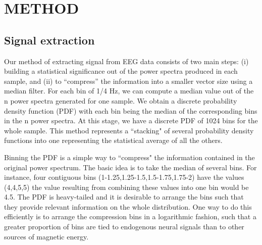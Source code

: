 \section{\uppercase{Method}}

\subsection{Signal extraction}

Our method of extracting signal from EEG data consists of two main steps: (i) building a statistical significance out of the power spectra produced in each sample, and (ii) to ``compress'' the information into a smaller vector size using a median filter. For each bin of 1/4 Hz, we can compute a median value out of the n power spectra generated for one sample. We obtain a discrete probability density function (PDF) with each bin being the median of the corresponding bins in the n power spectra. At this stage, we have a discrete PDF of 1024 bins for the whole sample. This method represents a ``stacking" of several probability density functions into one representing the statistical average of all the others.

Binning the PDF is a simple way to ``compress" the information contained in the original power spectrum. The basic idea is to take the median of several bins. For instance, four contiguous bins (1-1.25,1.25-1.5,1.5-1.75,1.75-2) have the values (4,4,5,5) the value resulting from combining these values into one bin would be 4.5. The PDF is heavy-tailed and it is desirable to arrange the bins such that they provide relevant information on the whole distribution. One way to do this efficiently is to arrange the compression bins in a logarithmic fashion, such that a greater proportion of bins are tied to endogenous neural signals than to other sources of magnetic energy.



